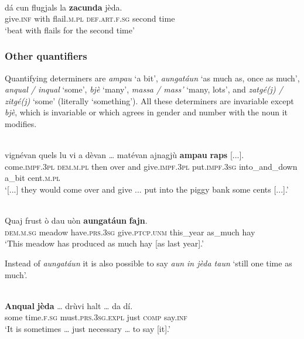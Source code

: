 \ea\label{}
\\
\gll  dá cun flugjals la \textbf{zacunda} jèda.\\
    give.\textsc{inf} with flail.\textsc{m.pl} \textsc{def.art.f.sg} second time \\
\glt `beat with flails for the second time'
\z

\subsubsection{Other quantifiers}
Quantifying determiners are \textit{ampau} `a bit', \textit{aungatáun} `as much as, once as much', \textit{anqual / inqual} `some', \textit{bjè} `many', \textit{massa / mass'} `many, lots', and \textit{zatgé(j) / zitgé(j)} `some' (literally `something'). All these determiners are invariable except \textit{bjè}, which is invariable or which agrees in gender and number with the noun it modifies.


\ea\label{}
\\
\gll    [...] vignévan quels lu vi a dèvan … matévan ajnagjù \textbf{ampau} \textbf{raps} [...].\\
 {} come.\textsc{impf.3pl} \textsc{dem.m.pl} then over and give.\textsc{impf.3pl} {} put.\textsc{impf.3sg} into\_and\_down a\_bit cent.\textsc{m.pl}\\
\glt `[...] they would come over and give ... put into the piggy bank some cents [...].'
\z

\ea\label{}
\\
\gll  Quaj frust ò dau uòn \textbf{aungatáun} \textbf{fajn}. \\
\textsc{dem.m.sg} meadow have.\textsc{prs.3sg} give.\textsc{ptcp.unm} this\_year as\_much hay \\
\glt `This meadow has produced as much hay [as last year].'
\z

Instead of \textit{aungatáun} it is also possible to say \textit{aun in jèda taun} `still one time as much'.

\ea
\label{}
\\
\gll  \textbf{Anqual} \textbf{jèda} … drùvi halt … da dí.\\
some time.\textsc{f.sg} {} must.\textsc{prs.3sg.expl} just {} \textsc{comp} say.\textsc{inf}\\
\glt `It is sometimes … just necessary … to say [it].'
\z

